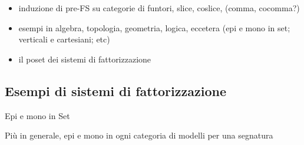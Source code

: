 \begin{itemize}
 \item induzione di pre-FS su categorie di funtori, slice, coslice, (comma, cocomma?)
 \item esempi in algebra, topologia, geometria, logica, eccetera (epi e mono in set; verticali e cartesiani; etc)
 \item il poset dei sistemi di fattorizzazione
\end{itemize}
\subsection{Esempi di sistemi di fattorizzazione}
\begin{example}
 Epi e mono in Set
\end{example}
Più in generale, epi e mono in ogni categoria di modelli per una segnatura
\begin{example}

\end{example}

\begin{example}

\end{example}

\begin{example}

\end{example}

\begin{example}

\end{example}

